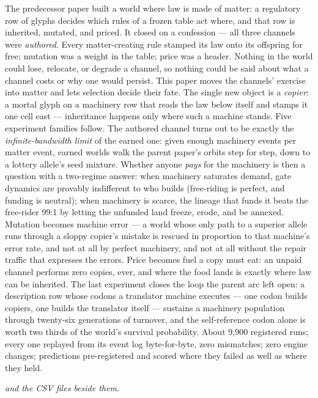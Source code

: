 The predecessor paper built a world where law is made of matter: a
regulatory row of glyphs decides which rules of a frozen table act
where, and that row is inherited, mutated, and priced. It closed on
a confession --- all three channels were {\it authored}. Every
matter-creating rule stamped its law onto its offspring for free;
mutation was a weight in the table; price was a header. Nothing in
the world could lose, relocate, or degrade a channel, so nothing
could be said about what a channel costs or why one would persist.
This paper moves the channels' exercise into matter and lets
selection decide their fate. The single new object is a {\it
copier}: a mortal glyph on a machinery row that reads the law
below itself and stamps it one cell east --- inheritance happens
only where such a machine stands. Five experiment families follow.
The authored channel turns out to be exactly the {\it
infinite-bandwidth limit} of the earned one: given enough
machinery events per matter event, earned worlds walk the parent
paper's orbits step for step, down to a lottery allele's seed
mixture. Whether anyone {\it pays} for the machinery is then a
question with a two-regime answer: when machinery saturates
demand, gate dynamics are provably indifferent to who builds
(free-riding is perfect, and funding is neutral); when machinery
is scarce, the lineage that funds it beats the free-rider 99:1 by
letting the unfunded land freeze, erode, and be annexed. Mutation
becomes machine error --- a world whose only path to a superior
allele runs through a sloppy copier's mistake is rescued in
proportion to that machine's error rate, and not at all by perfect
machinery, and not at all without the repair traffic that
expresses the errors. Price becomes fuel a copy must eat: an
unpaid channel performs zero copies, ever, and where the food
lands is exactly where law can be inherited. The last experiment
closes the loop the parent arc left open: a description row whose
codons a translator machine executes --- one codon builds copiers,
one builds the translator itself --- sustains a machinery
population through twenty-six generations of turnover, and the
self-reference codon alone is worth two thirds of the world's
survival probability. About 9{,}900 registered runs; every one
replayed from its event log byte-for-byte, zero mismatches; zero
engine changes; predictions pre-registered and scored where they
failed as well as where they held.

\medskip
{}  {\it and the CSV files
beside them.}


